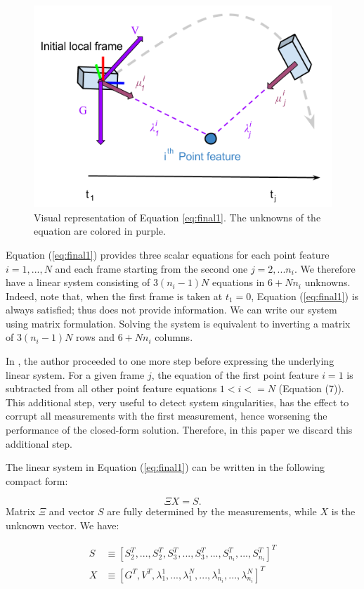 \documentclass[letterpaper, 10 pt, conference]{ieeeconf}  %
\begin{document}
\begin{figure}
  \centering
  \includegraphics[width=0.7\columnwidth, trim={0 2cm 0 0}, clip]{images/closedFormExplained}
  \caption{Visual representation of Equation \ref{eq:final1}.
  The unknowns of the equation are colored in \textcolor{amethyst}{purple}.}
\end{figure}

Equation (\ref{eq:final1}) provides three scalar equations for each point feature $i=1,...,N$ and each frame starting from the second one $j=2,...n_i$.
We therefore have a linear system consisting of $3(n_i-1)N$ equations in $6 + Nn_i$ unknowns.
Indeed, note that, when the first frame is taken at $t_1 = 0$,
Equation (\ref{eq:final1}) is always satisfied; thus does not provide information.
We can write our system using matrix formulation.
Solving the system is equivalent to inverting a matrix of $3(n_i-1)N$ rows and $6+Nn_i$ columns.

In \cite{Martinelli2014}, the author proceeded to one more step before expressing the underlying linear system.
For a given frame $j$, the equation of the first point feature $i=1$ is subtracted from all other point feature equations $1<i<=N$ (Equation (7)).
This additional step, very useful to detect system singularities, has the effect to corrupt all measurements with the first measurement,
hence worsening the performance of the closed-form solution. Therefore,
in this paper we discard this additional step.

The linear system in Equation (\ref{eq:final1}) can be written in the following compact form:

\begin{equation}
\label{eq:mat1}
\Xi X = S.
\end{equation}
\noindent Matrix $\Xi$ and vector $S$ are fully determined by the measurements, while $X$ is the unknown vector.
We have:

\begin{equation*}
  \begin{aligned}
S &\equiv [S_2^T, ...,S_2^T, S_3^T,...,S_3^T,...,S_{n_i}^T,...,S_{n_i}^T]^T \\
X &\equiv [ G^T, V^T, \lambda_1^1, ..., \lambda_1^N, ..., \lambda_{n_i}^1, ..., \lambda_{n_i}^N]^T
  \end{aligned}
\end{equation*}
\vspace{-1cm}
\end{document}
